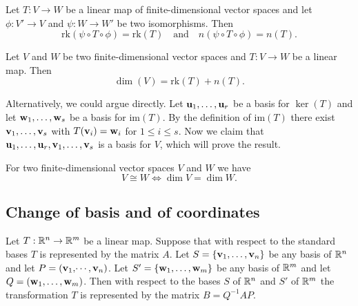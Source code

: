 \documentclass[10pt, a4paper]{article}
\begin{document}
\begin{proposition}
    Let $T : V \rightarrow W$ be a linear map of finite-dimensional vector spaces and let $\phi : V' \rightarrow V$ and $\psi : W \rightarrow W'$ be two isomorphisms.
    Then
    \[
    \mathrm{rk}(\psi \circ T \circ \phi) = \mathrm{rk}(T)\quad\text{and}\quad n(\psi \circ T \circ \phi) = n(T).
    \]
\end{proposition}

\begin{theorem}
    Let $V$ and $W$ be two finite-dimensional vector spaces and $T : V \rightarrow W$ be a linear map.
    Then
    \[
    \dim(V) = \mathrm{rk}(T) + n(T).
    \]
\end{theorem}

\begin{remark}
    Alternatively,
    we could argue directly.
    Let $\mathbf{u}_1, \dotsc, \mathbf{u}_r$ be a basis for $\ker(T)$ and let $\mathbf{w}_1, \dotsc, \mathbf{w}_s$ be a basis for $\mathrm{im}(T)$.
    By the definition of $\mathrm{im}(T)$ there exist $\mathbf{v}_1, \dotsc, \mathbf{v}_s$ with $T(\mathbf{v}_i) = \mathbf{w}_i$ for $1 \leq i \leq s$.
    Now we claim that $\mathbf{u}_1, \dotsc, \mathbf{u}_r, \mathbf{v}_1, \dotsc, \mathbf{v}_s$ is a basis for $V$,
    which will prove the result.
\end{remark}

\begin{theorem}
    For two finite-dimensional vector spaces $V$ and $W$ we have
    \[
    V \cong W \iff \dim{V} = \dim{W}.
    \]
\end{theorem}

\subsection{Change of basis and of coordinates}

\begin{theorem}
    Let $T : \mathbb{R} ^ n \rightarrow \mathbb{R} ^ m$ be a linear map.
    Suppose that with respect to the standard bases $T$ is represented by the matrix $A$.
    Let $S = \{\mathbf{v}_1, \dotsc, \mathbf{v}_n\}$ be any basis of $\mathbb{R} ^ n$ and let $P = (\mathbf{v}_1, \dotsi, \mathbf{v}_n)$.
    Let $S' = \{\mathbf{w}_1, \dotsc, \mathbf{w}_m\}$ be any basis of $\mathbb{R} ^ m$ and let $Q = (\mathbf{w}_1, \dotsc, \mathbf{w}_m)$.
    Then with respect to the bases $S$ of $\mathbb{R} ^ n$ and $S'$ of $\mathbb{R} ^ m$ the transformation $T$ is represented by the matrix $B = Q ^ {-1}AP$.
\end{theorem}
\end{document}

